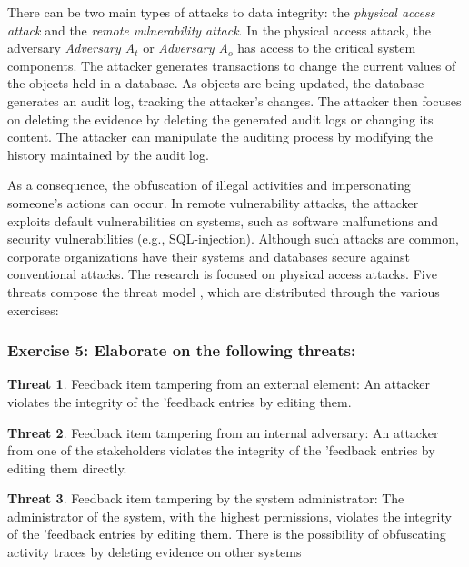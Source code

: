 \documentclass[12pt,a4paper]{article}
\theoremstyle{definition}
\newtheorem{threat}{Threat}[]
\begin{document}
There can be two main types of attacks to data integrity: the \emph{physical access attack} and the \emph{remote vulnerability attack}. In the physical access attack, the adversary \emph{Adversary A$_{t}$} or \emph{Adversary A$_{o}$} has access to the critical system components. The attacker generates transactions to change the current values of the objects held in a database. As objects are being updated, the database generates an audit log, tracking the attacker's changes. The attacker then focuses on deleting the evidence by deleting the generated audit logs or changing its content. The attacker can manipulate the auditing process by modifying the history maintained by the audit log.

As a consequence, the obfuscation of illegal activities and impersonating someone's actions can occur. In remote vulnerability attacks, the attacker exploits default vulnerabilities on systems, such as software malfunctions and security vulnerabilities (e.g., SQL-injection). Although such attacks are common, corporate organizations have their systems and databases secure against conventional attacks. The research is focused on physical access attacks. Five threats compose the threat model \cite{belchior2019_audits}, which are distributed through the various exercises:

\subsubsection*{Exercise 5: Elaborate on the following threats:}

\begin{threat}{Feedback item tampering from an external element:} An attacker violates the integrity of the 'feedback entries by editing them.
\end{threat}

\begin{threat}{Feedback item tampering from an internal adversary:} An attacker from one of the stakeholders violates the integrity of the 'feedback entries by editing them directly.
\end{threat}


\begin{threat}{Feedback item tampering by the system administrator:} The administrator of the system, with the highest permissions, violates the integrity of the 'feedback entries by editing them. There is the possibility of obfuscating activity traces by deleting evidence on other systems
\end{threat}
\end{document}
